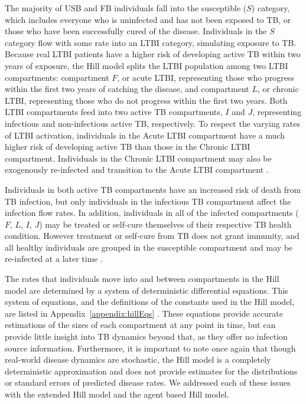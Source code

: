 \documentclass{amsart}
\renewcommand{\(}{\left(}
\renewcommand{\)}{\right)}
\begin{document}
The majority of USB and FB individuals fall into the susceptible ($S$) category,
which includes everyone who is uninfected and has not been exposed to TB, or
those who have been successfully cured of the disease. Individuals in the $S$
category flow with some rate into an LTBI category, simulating exposure to TB.
Because real LTBI patients have a higher risk of developing active TB within two
years of exposure, the Hill model splits the LTBI population among two LTBI
compartments: compartment $F$, or acute LTBI, representing those who progress
within the first two years of catching the disease, and compartment $L$, or
chronic LTBI, representing those who do not progress within the first two years.
Both LTBI compartments feed into two active TB compartments, $I$ and $J$,
representing infectious and non-infectious active TB, respectively. To respect
the varying rates of LTBI activation, individuals in the Acute LTBI compartment
have a much higher risk of developing active TB than those in the Chronic LTBI
compartment. Individuals in the Chronic LTBI compartment may also be exogenously
re-infected and transition to the Acute LTBI compartment
\cite{hill_modelling_2012}. 

Individuals in both active TB compartments have an increased risk of death from
TB infection, but only individuals in the infectious TB compartment affect the
infection flow rates. In addition, individuals in all of the infected
compartments ($F$, $L$, $I$, $J$) may be treated or self-cure themselves of
their respective TB health condition. However treatment or self-cure from TB
does not grant immunity, and all healthy individuals are grouped in the
susceptible compartment and may be re-infected at a later time
\cite{hill_modelling_2012}.

The rates that individuals move into and between compartments in the Hill model
are determined by a system of deterministic differential equations. This system
of equations, and the definitions of the constants used in the Hill model, are listed in
Appendix~\ref{appendix:hillEqs} \cite{hill_modelling_2012}. These equations
provide accurate estimations of the sizes of each compartment at any point in
time, but can provide little insight into TB dynamics beyond that, as they offer
no infection source information. Furthermore, it is important to note once again
that though real-world disease dynamics are stochastic, the Hill model is a
completely deterministic approximation and does not provide estimates for the
distributions or standard errors of predicted disease rates. We addressed each
of these issues with the extended Hill model and the agent based Hill model. 
\end{document}
